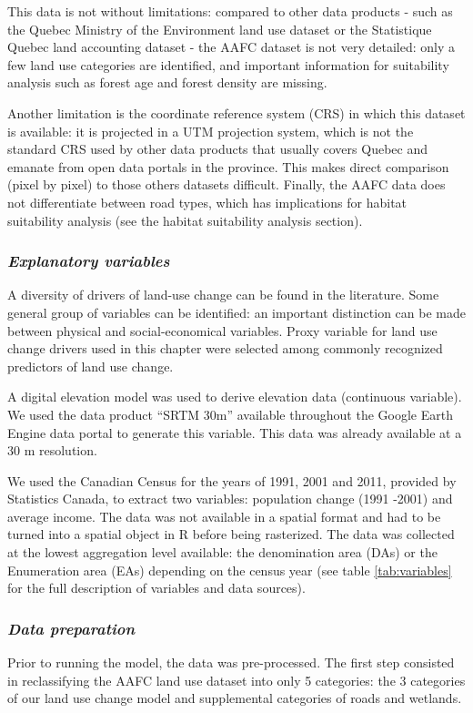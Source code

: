 This data is not without limitations: compared to other data products - such as the Quebec Ministry of the Environment land use dataset or the Statistique Quebec land accounting dataset - the AAFC dataset is not very detailed: only a few land use categories are identified, and important information for suitability analysis such as forest age and forest density are missing. 

Another limitation is the coordinate reference system (CRS) in which this dataset is available: it is projected in a UTM projection system, which is not the standard CRS used by other data products that usually covers Quebec and emanate from open data portals in the province. This makes direct comparison (pixel by pixel) to those others datasets difficult. Finally, the AAFC data does not differentiate between road types, which has implications for habitat suitability analysis (see the habitat suitability analysis section).\\

\subsubsection*{\textit{Explanatory variables}}
A diversity of drivers of land-use change can be found in the literature. Some general group of variables can be identified: an important distinction can be made between physical and social-economical variables. Proxy variable for land use change drivers used in this chapter were selected among commonly recognized predictors of land use change.

A digital elevation model was used to derive elevation data (continuous variable). We used the data product “SRTM 30m” available throughout the Google Earth Engine data portal to generate this variable. This data was already available at a 30 m resolution. 

We used the Canadian Census for the years of 1991, 2001 and 2011, provided by Statistics Canada, to extract two variables: population change (1991 -2001) and average income. The data was not available in a spatial format and had to be turned into a spatial object in R before being rasterized. The data was collected at the lowest aggregation level available: the denomination area (DAs) or the Enumeration area (EAs) depending on the census year (see table \ref{tab:variables} for the full description of variables and data sources).\\

\subsubsection*{\textit{Data preparation}}
Prior to running the model, the data was pre-processed. The first step consisted in reclassifying the AAFC land use dataset into only 5 categories: the 3 categories of our land use change model and supplemental categories of roads and wetlands.

